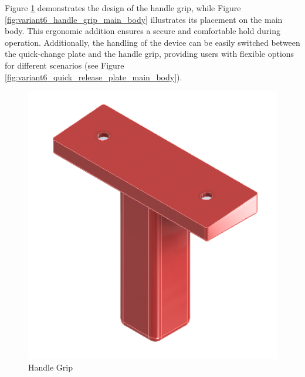 Figure \ref{fig:variant6_handle_grip} demonstrates the design of the handle grip, while Figure \ref{fig:variant6_handle_grip_main_body} illustrates its placement on the main body. This ergonomic addition ensures a secure and comfortable hold during operation. Additionally, the handling of the device can be easily switched between the quick-change plate and the handle grip, providing users with flexible options for different scenarios (see Figure \ref{fig:variant6_quick_release_plate_main_body}).

\begin{figure}[h!]
    \centering
    \includegraphics[width=0.5\linewidth]{texs/Part1/chapter4/image/v65.png}
    \caption{Handle Grip}
    \label{fig:variant6_handle_grip}
\end{figure}

